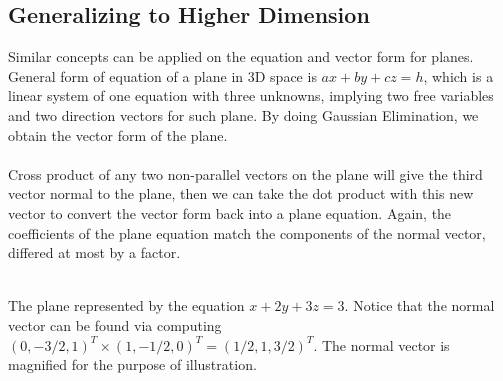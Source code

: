 \subsection{Generalizing to Higher Dimension}
Similar concepts can be applied on the equation and vector form for planes. General form of equation of a plane in 3D space is $ax + by + cz = h$, which is a linear system of one equation with three unknowns, implying two free variables and two direction vectors for such plane. By doing Gaussian Elimination, we obtain the vector form of the plane. \\
\\
Cross product of any two non-parallel vectors on the plane will give the third vector normal to the plane, then we can take the dot product with this new vector to convert the vector form back into a plane equation. Again, the coefficients of the plane equation match the components of the normal vector, differed at most by a factor.
\begin{center}
 \\
The plane represented by the equation $x + 2y + 3z = 3$. Notice that the normal vector can be found via computing $(0, -3/2, 1)^T \times (1, -1/2, 0)^T = (1/2, 1, 3/2)^T$. The normal vector is magnified for the purpose of illustration.
\end{center}

